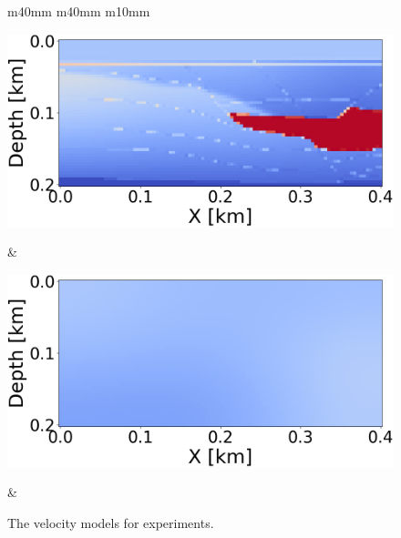 \begin{figure}[t]
    \centering
    \begin{tabular}{m{40mm} m{40mm} m{10mm}}
        \begin{minipage}[b]{\linewidth}
            \centering
            \includegraphics[width=\linewidth]{public/true}
            \caption*{}
        \end{minipage} &
        \hspace{-5mm}
        \begin{minipage}[b]{\linewidth}
            \centering
            \includegraphics[width=\linewidth]{public/initial}
            \caption*{}
        \end{minipage} &
        \hspace{-8mm}
    \end{tabular}
    \caption{The velocity models for experiments.}
    \vspace{2mm}
    \label{fig:experiment-data}
\end{figure}
